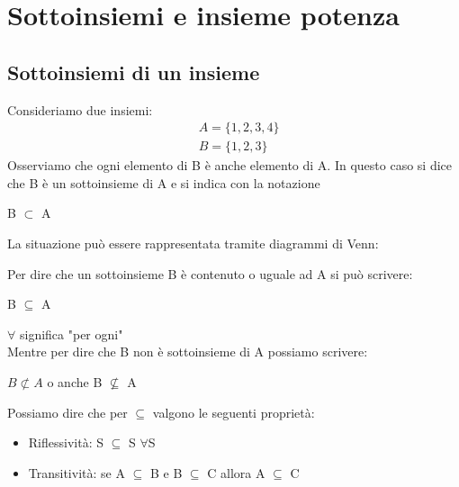 \section{Sottoinsiemi e insieme potenza}

\subsection{Sottoinsiemi di un insieme}
Consideriamo due insiemi:
\begin{align*}
    &A = \{1, 2, 3, 4\} \\
    &B = \{1, 2, 3\}
\end{align*}
Osserviamo che ogni elemento di B è anche elemento di A. In questo caso si dice che B è un sottoinsieme di A e si indica con la notazione
\begin{center}
    B $\subset$ A
\end{center}
La situazione può essere rappresentata tramite diagrammi di Venn:
\begin{center}
\end{center}
Per dire che un sottoinsieme B è contenuto o uguale ad A si può scrivere:
\begin{center}
    B $\subseteq$ A
\end{center}
 $\forall$ significa "per ogni" \\
Mentre per dire che B non è sottoinsieme di A possiamo scrivere:
\begin{center}
    $B \not \subset A$ o anche B $\not \subseteq$ A
\end{center}
Possiamo dire che per $\subseteq$ valgono le seguenti proprietà:
\begin{itemize}
    \item Riflessività: S $\subseteq$ S $\forall$S
    \item Transitività: se A $\subseteq$ B e B $\subseteq$ C allora A $\subseteq$ C
\end{itemize}
